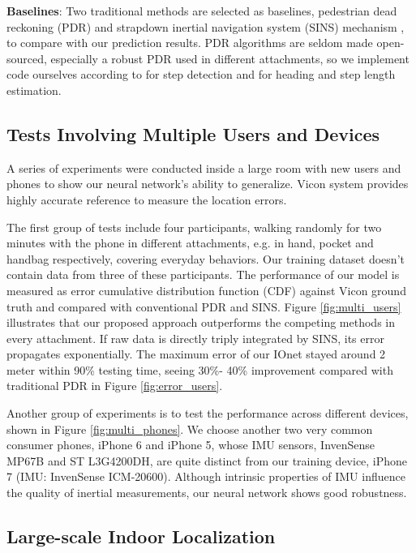 \documentclass[letterpaper]{article}
\begin{document}
	\textbf{Baselines}: Two traditional methods are selected as baselines, pedestrian dead reckoning (PDR) and strapdown inertial navigation system (SINS) mechanism \cite{Savage1998}, to compare with our prediction results. PDR algorithms are seldom made open-sourced, especially a robust PDR used in different attachments, so we implement code ourselves according to \cite{Brajdic2013} for step detection and \cite{Xiao2014} for heading and step length estimation.

\subsection{Tests Involving Multiple Users and Devices}
	
    A series of experiments were conducted inside a large room with new users and phones to show our neural network's ability to generalize. Vicon system provides highly accurate reference to measure the location errors.

    The first group of tests include four participants, walking randomly for two minutes with the phone in different attachments, e.g. in hand, pocket and handbag respectively, covering everyday behaviors. Our training dataset doesn't contain data from three of these participants. The performance of our model is measured as error cumulative distribution function (CDF) against Vicon ground truth and compared with conventional PDR and SINS. Figure \ref{fig:multi_users} illustrates that our proposed approach outperforms the competing methods in every attachment. If raw data is directly triply integrated by SINS, its error propagates exponentially. The maximum error of our IOnet stayed around 2 meter within 90\% testing time, seeing 30\%- 40\% improvement compared with traditional PDR in Figure \ref{fig:error_users}.

	Another group of experiments is to test the performance across different devices, shown in Figure \ref{fig:multi_phones}. We choose another two very common consumer phones, iPhone 6 and iPhone 5, whose IMU sensors, InvenSense MP67B and ST L3G4200DH, are quite distinct from our training device, iPhone 7 (IMU: InvenSense ICM-20600). Although intrinsic properties of IMU influence the quality of inertial measurements, our neural network shows good robustness.

\subsection{Large-scale Indoor Localization}
\end{document}
